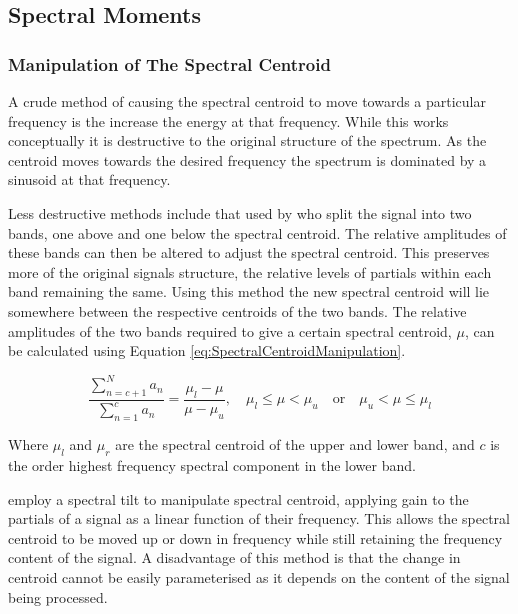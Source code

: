 

	\subsection{Spectral Moments}
	\label{sec:FeatureControl-Parameterisation-SpectralMoments}
		\subsubsection*{Manipulation of The Spectral Centroid}
			A crude method of causing the spectral centroid to move towards a particular frequency is the
			increase the energy at that frequency. While this works conceptually it is destructive to the
			original structure of the spectrum. As the centroid moves towards the desired frequency the
			spectrum is dominated by a sinusoid at that frequency.

			Less destructive methods include that used by \citet{zacharakis2011an} who split the signal into
			two bands, one above and one below the spectral centroid. The relative amplitudes of these bands
			can then be altered to adjust the spectral centroid. This preserves more of the original signals
			structure, the relative levels of partials within each band remaining the same. Using this method
			the new spectral centroid will lie somewhere between the respective centroids of the two bands. The
			relative amplitudes of the two bands required to give a certain spectral centroid, $\mu$, can be
			calculated using Equation \ref{eq:SpectralCentroidManipulation}.

			\begin{equation}
				\frac{\sum_{n = c + 1}^{N} a_{n}}
				     {{\sum_{n = 1}^{c} a_{n}}} = 
				\frac{\mu_{l} - \mu}{\mu - \mu_{u}}, 
				\quad \mu_{l} \leq \mu < \mu_{u} \quad \textrm{or} \quad \mu_{u} < \mu \leq \mu_{l}
				\label{eq:SpectralCentroidManipulation}
			\end{equation}

			Where $\mu_{l}$ and $\mu_{r}$ are the spectral centroid of the upper and lower band, and $c$ is the
			order highest frequency spectral component in the lower band.

			\citet{williams2007perceptually} employ a spectral tilt to manipulate spectral centroid, applying
			gain to the partials of a signal as a linear function of their frequency. This allows the spectral
			centroid to be moved up or down in frequency while still retaining the frequency content of the
			signal. A disadvantage of this method is that the change in centroid cannot be easily parameterised
			as it depends on the content of the signal being processed.

